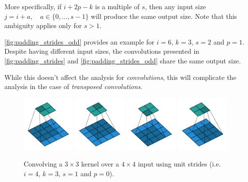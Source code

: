 \documentclass{report}
\begin{document}
More specifically, if $i + 2p - k$ is a multiple of $s$, then any input size $j
= i + a, \quad a \in \{0,\ldots,s - 1\}$ will produce the same output size. Note
that this ambiguity applies only for $s > 1$.

\autoref{fig:padding_strides_odd} provides an example for $i = 6$, $k = 3$, $s =
2$ and $p = 1$. Despite having different input sizes, the convolutions presented
in \autoref{fig:padding_strides} and \autoref{fig:padding_strides_odd} share the
same output size.

While this doesn't affect the analysis for {\em convolutions}, this will
complicate the analysis in the case of {\em transposed convolutions}.

\begin{figure}[p]
    \centering
    \includegraphics[width=0.24\textwidth]{pdf/no_padding_no_strides_00.pdf}
    \includegraphics[width=0.24\textwidth]{pdf/no_padding_no_strides_01.pdf}
    \includegraphics[width=0.24\textwidth]{pdf/no_padding_no_strides_02.pdf}
    \includegraphics[width=0.24\textwidth]{pdf/no_padding_no_strides_03.pdf}
    \caption{\label{fig:no_padding_no_strides} Convolving a $3 \times 3$ kernel
        over a $4 \times 4$ input using unit strides (i.e. $i = 4$, $k = 3$,
        $s = 1$ and $p = 0$).}
\end{figure}
\end{document}

